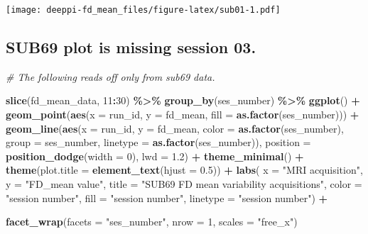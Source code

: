 \documentclass[
]{article}
\newenvironment{Shaded}{\begin{snugshade}}{\end{snugshade}}
\newcommand{\AttributeTok}[1]{\textcolor[rgb]{0.13,0.29,0.53}{#1}}
\newcommand{\CommentTok}[1]{\textcolor[rgb]{0.56,0.35,0.01}{\textit{#1}}}
\newcommand{\DecValTok}[1]{\textcolor[rgb]{0.00,0.00,0.81}{#1}}
\newcommand{\FloatTok}[1]{\textcolor[rgb]{0.00,0.00,0.81}{#1}}
\newcommand{\FunctionTok}[1]{\textcolor[rgb]{0.13,0.29,0.53}{\textbf{#1}}}
\newcommand{\NormalTok}[1]{#1}
\newcommand{\SpecialCharTok}[1]{\textcolor[rgb]{0.81,0.36,0.00}{\textbf{#1}}}
\newcommand{\StringTok}[1]{\textcolor[rgb]{0.31,0.60,0.02}{#1}}
\begin{document}
\texttt{[image: deeppi-fd\_mean\_files/figure-latex/sub01-1.pdf]}

\subsection{SUB69 plot is missing session
03.}\label{sub69-plot-is-missing-session-03.}

\begin{Shaded}
\begin{Highlighting}[]
\CommentTok{\# The following reads off only from sub69 data. }

\FunctionTok{slice}\NormalTok{(fd\_mean\_data, }\DecValTok{11}\SpecialCharTok{:}\DecValTok{30}\NormalTok{) }\SpecialCharTok{\%\textgreater{}\%}
  \FunctionTok{group\_by}\NormalTok{(ses\_number) }\SpecialCharTok{\%\textgreater{}\%}
    \FunctionTok{ggplot}\NormalTok{() }\SpecialCharTok{+} 
    \FunctionTok{geom\_point}\NormalTok{(}\FunctionTok{aes}\NormalTok{(}\AttributeTok{x =}\NormalTok{ run\_id, }\AttributeTok{y =}\NormalTok{ fd\_mean, }\AttributeTok{fill =} \FunctionTok{as.factor}\NormalTok{(ses\_number))) }\SpecialCharTok{+}
    \FunctionTok{geom\_line}\NormalTok{(}\FunctionTok{aes}\NormalTok{(}\AttributeTok{x =}\NormalTok{ run\_id, }\AttributeTok{y =}\NormalTok{ fd\_mean, }\AttributeTok{color =} \FunctionTok{as.factor}\NormalTok{(ses\_number), }
                  \AttributeTok{group =}\NormalTok{ ses\_number, }\AttributeTok{linetype =} \FunctionTok{as.factor}\NormalTok{(ses\_number)), }
              \AttributeTok{position =} \FunctionTok{position\_dodge}\NormalTok{(}\AttributeTok{width =} \DecValTok{0}\NormalTok{), }\AttributeTok{lwd =} \FloatTok{1.2}\NormalTok{) }\SpecialCharTok{+}
    \FunctionTok{theme\_minimal}\NormalTok{() }\SpecialCharTok{+}
    \FunctionTok{theme}\NormalTok{(}\AttributeTok{plot.title =} \FunctionTok{element\_text}\NormalTok{(}\AttributeTok{hjust =} \FloatTok{0.5}\NormalTok{)) }\SpecialCharTok{+}
    \FunctionTok{labs}\NormalTok{(}
    \AttributeTok{x =} \StringTok{"MRI acquisition"}\NormalTok{, }
    \AttributeTok{y =} \StringTok{"FD\_mean value"}\NormalTok{, }
    \AttributeTok{title =} \StringTok{"SUB69 FD mean variability acquisitions"}\NormalTok{,}
    \AttributeTok{color =} \StringTok{"session number"}\NormalTok{,}
    \AttributeTok{fill =} \StringTok{"session number"}\NormalTok{,}
    \AttributeTok{linetype =} \StringTok{"session number"}\NormalTok{) }\SpecialCharTok{+} 

    \FunctionTok{facet\_wrap}\NormalTok{(}\AttributeTok{facets =} \StringTok{"ses\_number"}\NormalTok{, }\AttributeTok{nrow =} \DecValTok{1}\NormalTok{, }\AttributeTok{scales =} \StringTok{"free\_x"}\NormalTok{) }
\end{Highlighting}
\end{Shaded}
\end{document}
